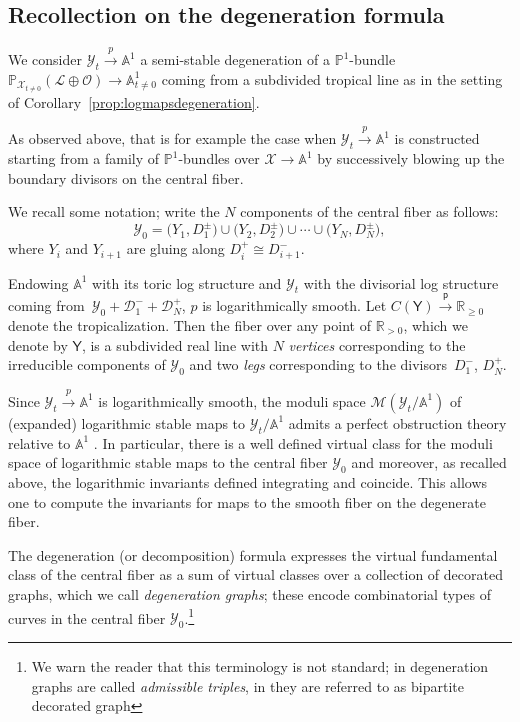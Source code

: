\documentclass[pdftex]{sigma}
\newcommand{\vir}[1]{\big[#1\big]^\mathrm{vir}}
\renewcommand{\L}{\mathcal{L}}
\newcommand{\M}{\mathcal{M}}
\newcommand{\X}{\mathcal{X}}
\renewcommand{\O}{\mathcal{O}}
\newcommand{\Y}{\mathcal{Y}}
\renewcommand{\geq}{\geqslant}
\numberwithin{equation}{section}
\theoremstyle{definition}
\begin{document}
 \subsection{Recollection on the degeneration formula}

We consider $\Y_t\xrightarrow{p}\mathbb A^1$ a semi-stable degeneration of a $\mathbb P^1$-bundle $\mathbb P_{\X_{t\neq 0}}(\L\oplus\O)\to\mathbb A^1_{t\neq 0}$ coming from a subdivided tropical line as in the setting of Corollary~\ref{prop:logmapsdegeneration}.

As observed above, that is for example the case when $\Y_t\xrightarrow{p}\mathbb A^1$ is constructed starting from a family of $\mathbb P^1$-bundles over $\X\to\mathbb A^1$ by successively blowing up the boundary divisors on the central fiber.

We recall some notation; write the $N$ components of the central fiber as follows:
\[\Y_0=\bigl(Y_1, D_1^\pm\bigr)\cup \bigl(Y_2, D_2^\pm\bigr)\cup\cdots\cup \bigl(Y_N, D_N^\pm\bigr),\]
where $Y_i$ and $Y_{i+1}$ are gluing along $D_i^+\cong D_{i+1}^-$.

Endowing $\mathbb A^1$ with its toric log structure and $\Y_t$ with the divisorial log structure coming from~${\Y_0+\mathcal D_1^-+\mathcal D_N^+}$, $p$ is logarithmically smooth. Let $C(\mathsf{Y})\xrightarrow{\mathsf{p}} \mathbb R_{\geq 0}$ denote the tropicalization. Then the fiber over any point of $\mathbb R_{>0}$, which we denote by $\mathsf{Y}$, is a subdivided real line with $N$ \emph{vertices} corresponding to the irreducible components of $\Y_0$ and two \emph{legs} corresponding to the divisors~$D_1^-$, $D_N^+$.



Since $\Y_t\xrightarrow{p}\mathbb A^1$ is logarithmically smooth, the moduli space $\M(\Y_t\slash\mathbb A^1)$ of (expanded) logarithmic stable maps to $\Y_t\slash\mathbb A^1$ admits a perfect obstruction theory relative to $\mathbb A^1$ \cite{chen2013degeneration,gross2013logarithmic,li2001stable,maulik2023logarithmic}. In particular, there is a well defined virtual class \smash{$\vir{\M_0}$} for the moduli space of logarithmic stable maps to the central fiber $\Y_0$ and moreover, as recalled above, the logarithmic invariants defined integrating
\smash{$\vir{\M_0}$} and \smash{$\vir{\M_t}$} coincide. This allows one to compute the invariants for maps to the smooth fiber on the degenerate fiber.

The degeneration (or decomposition) formula \cite{chen2013degeneration,kim2018degeneration,li2002degeneration} expresses the virtual fundamental class of the central fiber \smash{$\vir{\M_0}$} as a sum of virtual classes over a collection of decorated graphs, which we call \textit{degeneration graphs}; these encode combinatorial types of curves in the central fiber $\Y_0$.\footnote{ We warn the reader that this terminology is not standard; in \cite{li2002degeneration} degeneration graphs are called \emph{admissible triples}, in \cite{kim2018degeneration} they are referred to as bipartite decorated graph}
\end{document}
